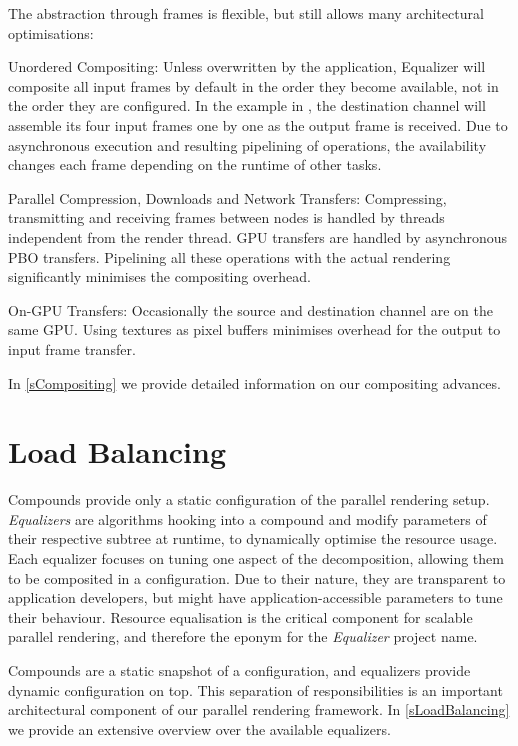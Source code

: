 The abstraction through frames is flexible, but still allows many architectural
optimisations:
\begin{compactdesc}
\item[Unordered Compositing:] Unless overwritten by the application, Equalizer
will composite all input frames by default in the order they become available, not in the
order they are configured. In the example in  , the
destination channel will assemble its four input frames one by one as the output
frame is received. Due to asynchronous execution and resulting pipelining of
operations, the availability changes each frame depending on the runtime of
other tasks.

\item[Parallel Compression, Downloads and Network Transfers:] Compressing,
transmitting and receiving frames between nodes is handled by threads
independent from the render thread. GPU transfers are handled by asynchronous
PBO transfers. Pipelining all these operations with the actual rendering
significantly minimises the compositing overhead.

\item[On-GPU Transfers:] Occasionally the source and destination channel are on
the same GPU. Using textures as pixel buffers minimises overhead for the
output to input frame transfer.
\end{compactdesc}

In \cref{sCompositing} we provide detailed information on our compositing advances.

\section{Load Balancing}

Compounds provide only a static configuration of the parallel rendering setup.
{\em Equalizers} are algorithms hooking into a compound and modify
parameters of their respective subtree at runtime, to dynamically optimise the
resource usage. Each equalizer focuses on tuning one aspect of the
decomposition, allowing them to be composited in a configuration. Due to their
nature, they are transparent to application developers, but might have
application-accessible parameters to tune their behaviour. Resource
equalisation is the critical component for scalable parallel rendering, and
therefore the eponym for the {\em Equalizer} project name.

Compounds are a static snapshot of a configuration, and equalizers provide
dynamic configuration on top. This separation of responsibilities is an
important architectural component of our parallel rendering framework. In
\cref{sLoadBalancing} we provide an extensive overview over the available
equalizers.

